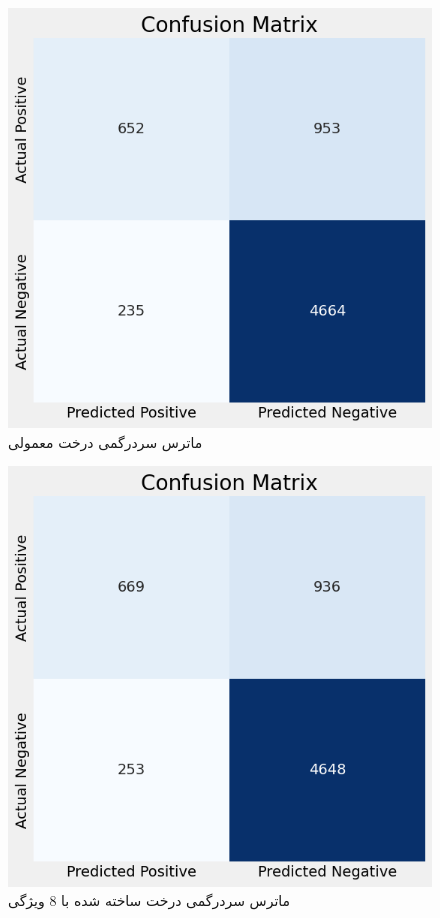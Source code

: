 \documentclass{article}
\begin{document}
	\begin{figure}[H]
		\centering
		\includegraphics[scale=0.6]{figs/confall}
		\caption{
			ماترس سردرگمی
			 درخت معمولی
		}
		\label{fig: conf all}
	\end{figure}
	\begin{figure}[H]
		\centering
		\includegraphics[scale=0.6]{figs/conf8}
		\caption{
			ماترس سردرگمی
			درخت ساخته شده با 8 ویژگی
		}
		\label{fig: conf 8}
	\end{figure}
\end{document}
